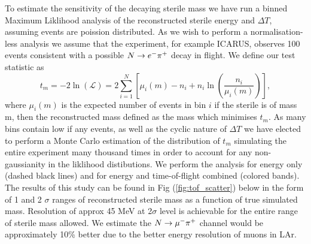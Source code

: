 \documentclass[11pt, a4paper]{article}
\def\ster{\ensuremath N}
\begin{document}
To estimate the sensitivity of the decaying sterile mass we have run a binned
Maximum Liklihood analysis of the reconstructed sterile energy and $\Delta T$,
assuming events are poission distributed. As we wish to perform a
normalisation-less analysis we assume that the experiment, for example ICARUS,
observes 100 events consistent with a possible $\ster\rightarrow e^- \pi^+$
decay in flight. We define our test statistic as \cite{Agashe:2014kda} \[ t_m =
-2 \ln \left(\mathcal{L}\right) =  2 \sum_{i=1}^N \left[ \mu_i(m)-n_i +n_i
\ln(\frac{n_i}{\mu_i(m)})  \right], \] where $\mu_i(m)$ is the expected number
of events in bin $i$ if the sterile is of mass m, then the reconstructed mass
defined as the mass which minimises $t_m$. As many bins contain low if any
events, as well as the cyclic nature of $\Delta T$ we have elected to perform a
Monte Carlo estimation of the distribution of $t_m$ simulating the entire
experiment many thousand times in order to account for any non-gaussianity in
the liklihood distibutions. We perform the analysis for energy only (dashed
black lines) and for energy and time-of-flight combined (colored bands). The
results of this study can be found in Fig (\ref{fig:tof_scatter}) below in the
form of 1 and 2 $\sigma$ ranges of reconstructed sterile mass as a function of
true simulated mass. Resolution of approx 45 MeV at 2$\sigma$ level is
achievable for the entire range of sterile mass allowed. We estimate the
$\ster\rightarrow \mu^- \pi^+$ channel would be approximately 10\% better due
to the better energy resolution of muons in LAr.  
\end{document}
